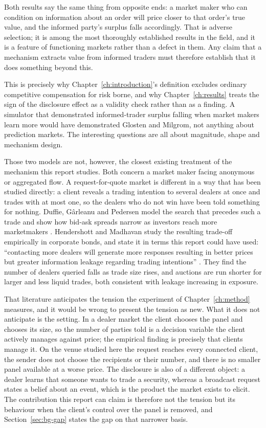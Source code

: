 Both results say the same thing from opposite ends: a market maker who can condition on
information about an order will price closer to that order's true value, and the informed
party's surplus falls accordingly. That is adverse selection; it is among the most
thoroughly established results in the field, and it is a feature of functioning markets
rather than a defect in them. Any claim that a mechanism extracts value from informed
traders must therefore establish that it does something beyond this.

This is precisely why Chapter~\ref{ch:introduction}'s definition excludes ordinary
competitive compensation for risk borne, and why Chapter~\ref{ch:results} treats the sign of
the disclosure effect as a validity check rather than as a finding. A simulator that
demonstrated informed-trader surplus falling when market makers learn more would have
demonstrated Glosten and Milgrom, not anything about prediction markets. The interesting
questions are all about magnitude, shape and mechanism design.

Those two models are not, however, the closest existing treatment of the mechanism this
report studies. Both concern a market maker facing anonymous or aggregated flow. A
request-for-quote market is different in a way that has been studied directly: a client
reveals a trading intention to several dealers at once and trades with at most one, so the
dealers who do not win have been told something for nothing. Duffie, G\^{a}rleanu and
Pedersen model the search that precedes such a trade and show how bid-ask spreads narrow as
investors reach more marketmakers \cite{duffie2005otc}. Hendershott and Madhavan study the
resulting trade-off empirically in corporate bonds, and state it in terms this report could
have used: ``contacting more dealers will generate more responses resulting in better prices
but greater information leakage regarding trading intentions'' \cite{hendershott2015click}.
They find the number of dealers queried falls as trade size rises, and auctions are run
shorter for larger and less liquid trades, both consistent with leakage increasing in
exposure.

That literature anticipates the tension the experiment of Chapter~\ref{ch:method} measures,
and it would be wrong to present the tension as new. What it does not anticipate is the
setting. In a dealer market the client chooses the panel and chooses its size, so the number
of parties told is a decision variable the client actively manages against price; the
empirical finding is precisely that clients manage it. On the venue studied here the request
reaches every connected client, the sender does not choose the recipients or their number,
and there is no smaller panel available at a worse price. The disclosure is also of a
different object: a dealer learns that someone wants to trade a security, whereas a
broadcast request states a belief about an event, which is the product the market exists to
elicit. The contribution this report can claim is therefore not the tension but its
behaviour when the client's control over the panel is removed, and
Section~\ref{sec:bg-gap} states the gap on that narrower basis.

